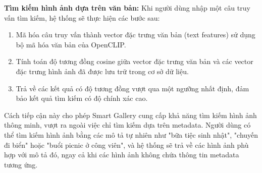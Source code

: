 \textbf{Tìm kiếm hình ảnh dựa trên văn bản:} Khi người dùng nhập một câu truy vấn tìm kiếm, hệ thống sẽ thực hiện các bước sau:

\begin{enumerate}
    \item Mã hóa câu truy vấn thành vector đặc trưng văn bản (text features) sử dụng bộ mã hóa văn bản của OpenCLIP.
    
    \item Tính toán độ tương đồng cosine giữa vector đặc trưng văn bản và các vector đặc trưng hình ảnh đã được lưu trữ trong cơ sở dữ liệu.
    
    \item Trả về các kết quả có độ tương đồng vượt qua một ngưỡng nhất định, đảm bảo kết quả tìm kiếm có độ chính xác cao.
\end{enumerate}

Cách tiếp cận này cho phép Smart Gallery cung cấp khả năng tìm kiếm hình ảnh thông minh, vượt ra ngoài việc chỉ tìm kiếm dựa trên metadata. Người dùng có thể tìm kiếm hình ảnh bằng các mô tả tự nhiên như "bữa tiệc sinh nhật", "chuyến đi biển" hoặc "buổi picnic ở công viên", và hệ thống sẽ trả về các hình ảnh phù hợp với mô tả đó, ngay cả khi các hình ảnh không chứa thông tin metadata tương ứng.



